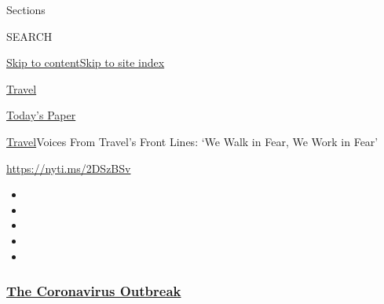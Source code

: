 Sections

SEARCH

\protect\hyperlink{site-content}{Skip to
content}\protect\hyperlink{site-index}{Skip to site index}

\href{https://www.nytimes3xbfgragh.onion/section/travel}{Travel}

\href{https://myaccount.nytimes3xbfgragh.onion/auth/login?response_type=cookie\&client_id=vi}{}

\href{https://www.nytimes3xbfgragh.onion/section/todayspaper}{Today's
Paper}

\href{/section/travel}{Travel}\textbar{}Voices From Travel's Front
Lines: `We Walk in Fear, We Work in Fear'

\url{https://nyti.ms/2DSzBSv}

\begin{itemize}
\item
\item
\item
\item
\item
\end{itemize}

\hypertarget{the-coronavirus-outbreak}{%
\subsubsection{\texorpdfstring{\href{https://www.nytimes3xbfgragh.onion/news-event/coronavirus?name=styln-coronavirus-national\&region=TOP_BANNER\&variant=undefined\&block=storyline_menu_recirc\&action=click\&pgtype=Article\&impression_id=161a0f50-e3af-11ea-918c-0f8207e68c04}{The
Coronavirus
Outbreak}}{The Coronavirus Outbreak}}\label{the-coronavirus-outbreak}}

